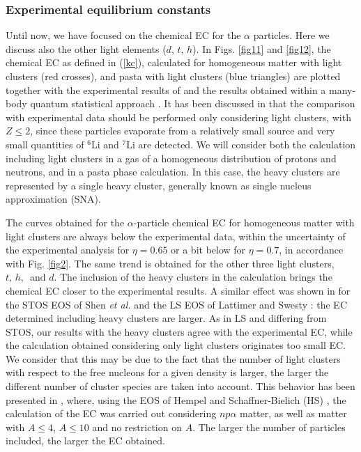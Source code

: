\documentclass[aps,prc,nofootinbib,twocolumn,showpacs]{revtex4-1}
\begin{document}
\subsubsection{Experimental equilibrium constants}



 Until now, we have focused on the chemical EC for the $\alpha$ particles. Here we discuss also the other light elements ($d$, $t$, $h$). In Figs. \ref{fig11} and  \ref{fig12}, the chemical EC  
 as defined in (\ref{kc}), calculated for
homogeneous matter with light clusters (red crosses), and pasta with light clusters (blue triangles) are plotted
together with the experimental results of \cite{qin12}  and the
results obtained within a many-body quantum statistical approach
\cite{roepke15}. It has been discussed in  \cite{hempel2015}  that the
comparison with experimental data should be performed only
considering light clusters, with $Z\le 2$, since these particles
evaporate from a relatively small source and very small quantities of
$^6$Li and $^7$Li are detected. We will consider both the calculation
including light clusters in a gas of a homogeneous distribution of
protons and neutrons, and in a pasta phase calculation. In this case,
the heavy clusters are represented by a single heavy cluster,
generally known as single nucleus approximation (SNA).

The curves obtained for the $\alpha$-particle chemical EC 
 for homogeneous matter with light
clusters are always below the experimental data, within the
uncertainty of the experimental analysis for $\eta=0.65$ or a bit
below for $\eta=0.7$, in accordance with 
Fig. \ref{fig2}. The same trend is obtained for the other three
light clusters, $t,\, h,\,$ and  $d$. The inclusion of the heavy
clusters in the calculation brings the chemical EC  
closer to the experimental results. A similar effect was shown in
\cite{hempel2015} for the STOS EOS of Shen {\it et al.} \cite{stos} and
the LS EOS of Lattimer and Swesty  \cite{LS}: the EC determined including 
heavy clusters are larger.  As in LS and differing from STOS, our
results with 
the heavy clusters agree with the experimental EC,
while the calculation obtained considering only light clusters
originates too small EC. We consider that this may be due to the fact
that 
the number of light clusters with respect to the free nucleons for a
given density is larger, the larger the different number of cluster species are
taken into account. This behavior has been presented in
\cite{hempel2015}, where, using the  EOS of Hempel and Schaffner-Bielich (HS) \cite{HSB}, the calculation of the EC was
carried out considering $np\alpha$ matter, as well as  matter with $A\le 4$,
$A\le10$ and no restriction on $A$. The larger the number of particles
included, the larger the EC obtained.
\end{document}
